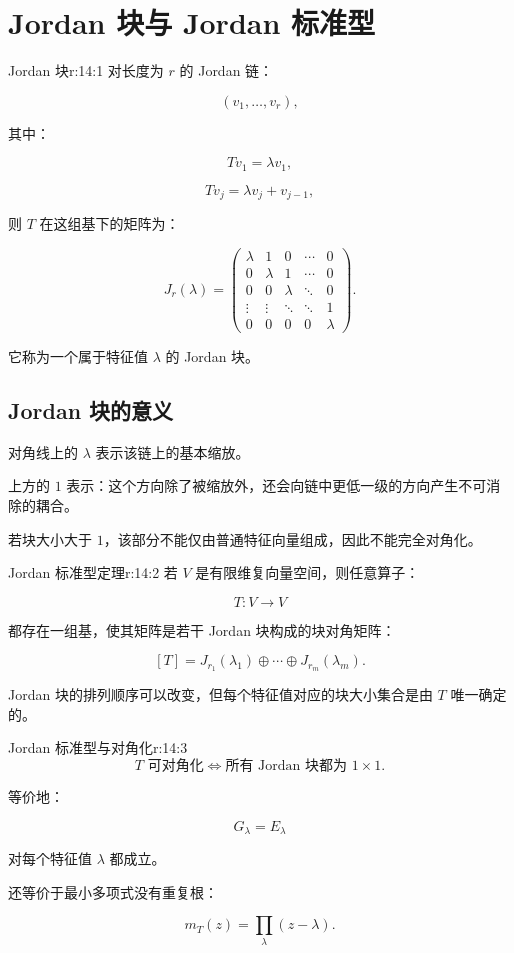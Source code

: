 
\chapter{Jordan 块与 Jordan 标准型}


\begin{jdefn}{Jordan 块}{r:14:1}
对长度为 $r$ 的 Jordan 链：

\[
(v_1,\ldots,v_r),
\]

其中：

\[
Tv_1=\lambda v_1,
\]

\[
Tv_j=\lambda v_j+v_{j-1},
\]

则 $T$ 在这组基下的矩阵为：

\[
J_r(\lambda)
=
\begin{pmatrix}
\lambda&1&0&\cdots&0\\
0&\lambda&1&\cdots&0\\
0&0&\lambda&\ddots&0\\
\vdots&\vdots&\ddots&\ddots&1\\
0&0&0&0&\lambda
\end{pmatrix}.
\]

它称为一个属于特征值 $\lambda$ 的 Jordan 块。
\end{jdefn}

\section{Jordan 块的意义}

对角线上的 $\lambda$ 表示该链上的基本缩放。

上方的 $1$ 表示：这个方向除了被缩放外，还会向链中更低一级的方向产生不可消除的耦合。

若块大小大于 $1$，该部分不能仅由普通特征向量组成，因此不能完全对角化。

\begin{jthm}{Jordan 标准型定理}{r:14:2}
若 $V$ 是有限维复向量空间，则任意算子：

\[
T:V\to V
\]

都存在一组基，使其矩阵是若干 Jordan 块构成的块对角矩阵：

\[
[T]
=
J_{r_1}(\lambda_1)
\oplus
\cdots
\oplus
J_{r_m}(\lambda_m).
\]

Jordan 块的排列顺序可以改变，但每个特征值对应的块大小集合是由 $T$ 唯一确定的。
\end{jthm}

\begin{jprop}{Jordan 标准型与对角化}{r:14:3}
\[
T\text{ 可对角化}
\iff
\text{所有 Jordan 块都为 }1\times1.
\]

等价地：

\[
G_\lambda=E_\lambda
\]

对每个特征值 $\lambda$ 都成立。

还等价于最小多项式没有重复根：

\[
m_T(z)
=
\prod_\lambda(z-\lambda).
\]
\end{jprop}

